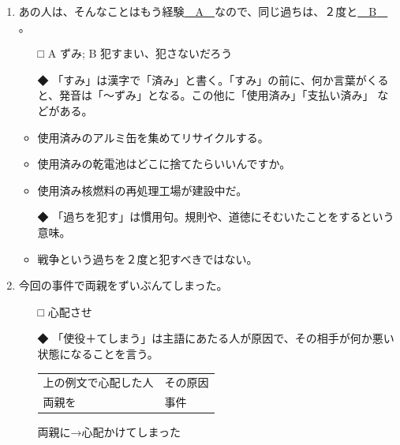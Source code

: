 \documentclass[
uplatex,
b5paper,
10pt,
dvipdfmx
]{jsbook}
\begin{document}
\begin{enumerate}
\item あの人は、そんなことはもう経験\underline{　A　}なので、同じ過ちは、２度と\underline{　B　}。

\begin{itemize}
\item[□] A ずみ; B 犯すまい、犯さないだろう
\item[◆] 「すみ」は漢字で「済み」と書く。「すみ」の前に、何か言葉がくる
	  と、発音は「〜ずみ」となる。この他に「使用済み」「支払い済み」
	  などがある。
\end{itemize}
\begin{itemize}
 \item 使用済みのアルミ缶を集めてリサイクルする。
 \item 使用済みの乾電池はどこに捨てたらいいんですか。
 \item 使用済み核燃料の再処理工場が建設中だ。
\end{itemize}
\begin{itemize}
\item[◆] 「過ちを犯す」は慣用句。規則や、道徳にそむいたことをするという意味。
\end{itemize}
\begin{itemize}
 \item 戦争という過ちを２度と犯すべきではない。
\end{itemize}

\item 今回の事件で両親をずいぶん\underline{\hspace{3zw}}てしまった。      

\begin{itemize}
\item[□] 心配させ
\item[◆] 「使役＋てしまう」は主語にあたる人が原因で、その相手が何か悪い
	  状態になることを言う。

\begin{tabular}[c]{ll}
上の例文で心配した人 & その原因 \\
両親を               & 事件 \\
\end{tabular}
両親に→心配かけてしまった
\end{itemize}
\vspace{1\baselineskip}	  


\end{enumerate}
\end{document}
